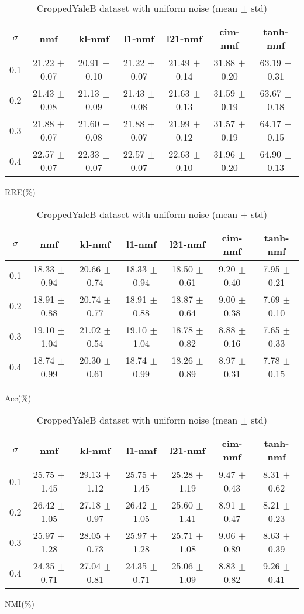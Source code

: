 \documentclass{article} %
\begin{document}
\begin{table}
\begin{subtable}{\linewidth}
\begin{tabular}{c|cccccc}$\sigma$ & nmf & kl-nmf & l1-nmf & l21-nmf & cim-nmf & tanh-nmf \\\hline
0.1 & 21.22 $\pm$ 0.07 & 20.91 $\pm$ 0.10 & 21.22 $\pm$ 0.07 & 21.49 $\pm$ 0.14 & 31.88 $\pm$ 0.20 & 63.19 $\pm$ 0.31 \\
0.2 & 21.43 $\pm$ 0.08 & 21.13 $\pm$ 0.09 & 21.43 $\pm$ 0.08 & 21.63 $\pm$ 0.13 & 31.59 $\pm$ 0.19 & 63.67 $\pm$ 0.18 \\
0.3 & 21.88 $\pm$ 0.07 & 21.60 $\pm$ 0.08 & 21.88 $\pm$ 0.07 & 21.99 $\pm$ 0.12 & 31.57 $\pm$ 0.19 & 64.17 $\pm$ 0.15 \\
0.4 & 22.57 $\pm$ 0.07 & 22.33 $\pm$ 0.07 & 22.57 $\pm$ 0.07 & 22.63 $\pm$ 0.10 & 31.96 $\pm$ 0.20 & 64.90 $\pm$ 0.13 \\
\end{tabular}\caption{RRE(\%)}\end{subtable}
\begin{subtable}{\linewidth}
\begin{tabular}{c|cccccc}$\sigma$ & nmf & kl-nmf & l1-nmf & l21-nmf & cim-nmf & tanh-nmf \\\hline
0.1 & 18.33 $\pm$ 0.94 & 20.66 $\pm$ 0.74 & 18.33 $\pm$ 0.94 & 18.50 $\pm$ 0.61 & 9.20 $\pm$ 0.40 & 7.95 $\pm$ 0.21 \\
0.2 & 18.91 $\pm$ 0.88 & 20.74 $\pm$ 0.77 & 18.91 $\pm$ 0.88 & 18.87 $\pm$ 0.64 & 9.00 $\pm$ 0.38 & 7.69 $\pm$ 0.10 \\
0.3 & 19.10 $\pm$ 1.04 & 21.02 $\pm$ 0.54 & 19.10 $\pm$ 1.04 & 18.78 $\pm$ 0.82 & 8.88 $\pm$ 0.16 & 7.65 $\pm$ 0.33 \\
0.4 & 18.74 $\pm$ 0.99 & 20.30 $\pm$ 0.61 & 18.74 $\pm$ 0.99 & 18.26 $\pm$ 0.89 & 8.97 $\pm$ 0.31 & 7.78 $\pm$ 0.15 \\
\end{tabular}\caption{Acc(\%)}\end{subtable}
\begin{subtable}{\linewidth}
\begin{tabular}{c|cccccc}$\sigma$ & nmf & kl-nmf & l1-nmf & l21-nmf & cim-nmf & tanh-nmf \\\hline
0.1 & 25.75 $\pm$ 1.45 & 29.13 $\pm$ 1.12 & 25.75 $\pm$ 1.45 & 25.28 $\pm$ 1.19 & 9.47 $\pm$ 0.43 & 8.31 $\pm$ 0.62 \\
0.2 & 26.42 $\pm$ 1.05 & 27.18 $\pm$ 0.97 & 26.42 $\pm$ 1.05 & 25.60 $\pm$ 1.41 & 8.91 $\pm$ 0.47 & 8.21 $\pm$ 0.23 \\
0.3 & 25.97 $\pm$ 1.28 & 28.05 $\pm$ 0.73 & 25.97 $\pm$ 1.28 & 25.71 $\pm$ 1.08 & 9.06 $\pm$ 0.89 & 8.63 $\pm$ 0.39 \\
0.4 & 24.35 $\pm$ 0.71 & 27.04 $\pm$ 0.81 & 24.35 $\pm$ 0.71 & 25.06 $\pm$ 1.09 & 8.83 $\pm$ 0.82 & 9.26 $\pm$ 0.41 \\
\end{tabular}\caption{NMI(\%)}\end{subtable}
\caption{CroppedYaleB dataset with uniform noise (mean $\pm$ std)}
\end{table}
\end{document}
